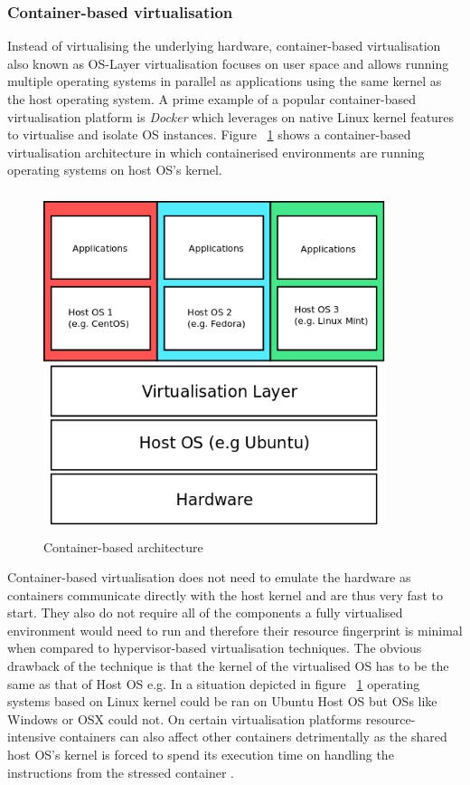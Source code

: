 \subsubsection{Container-based virtualisation}

Instead of virtualising the underlying hardware, container-based virtualisation also known as OS-Layer virtualisation \cite{taxonomy} focuses on user space and allows running multiple operating systems in parallel as applications using the same kernel as the host operating system. A prime example of a popular container-based virtualisation platform is \textit{Docker} \cite{docker} which leverages on native Linux kernel features to virtualise and isolate OS instances. Figure ~\ref{fig:container} shows a container-based virtualisation architecture in which containerised environments are running operating systems on host OS's kernel. 

\begin{figure}[ht!]
\centering
  \includegraphics[width=10cm,height=10cm, keepaspectratio]{containers.png}%
  \caption{Container-based architecture}
  \label{fig:container}
\end{figure}

Container-based virtualisation does not need to emulate the hardware as containers communicate directly with the host kernel \cite{eder2016hypervisor} and are thus very fast to start. They also do not require all of the components a fully virtualised environment would need to run and therefore their resource fingerprint is minimal when compared to hypervisor-based virtualisation techniques. \linebreak
The obvious drawback of the technique is that the kernel of the virtualised OS has to be the same as that of Host OS e.g. In a situation depicted in figure ~\ref{fig:container} operating systems based on  Linux kernel could be ran on Ubuntu Host OS but OSs like Windows or OSX could not. On certain virtualisation platforms resource-intensive containers can also affect other containers detrimentally as the shared host OS's kernel is forced to spend its execution time on handling the instructions from the stressed container \cite{Xaviercontainer}.


